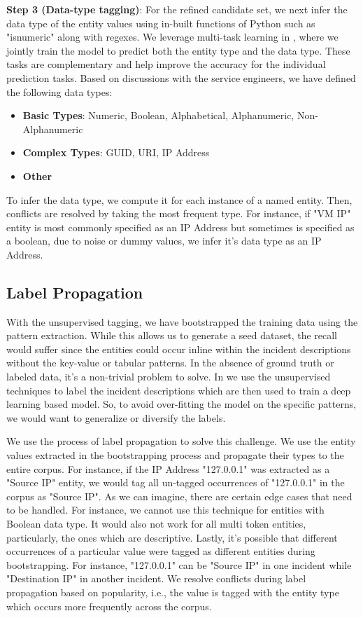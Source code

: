 \textbf{Step 3 (Data-type tagging)}: For the refined candidate set, we next infer the data type of the entity values using in-built functions of Python such as "isnumeric" along with regexes. We leverage multi-task learning in \softner{}, where we jointly train the model to predict both the entity type and the data type. These tasks are complementary and help improve the accuracy for the individual prediction tasks. Based on discussions with the service engineers, we have defined the following data types:
\begin{itemize}
    \item \textbf{Basic Types}: Numeric, Boolean, Alphabetical, Alphanumeric, Non-Alphanumeric
    \item \textbf{Complex Types}: GUID, URI, IP Address
    \item \textbf{Other}
\end{itemize}
To infer the data type, we compute it for each instance of a named entity. Then, conflicts are resolved by taking the most frequent type. For instance, if "VM IP" entity is most commonly specified as an IP Address but sometimes is specified as a boolean, due to noise or dummy values, we infer it's data type as an IP Address.

\subsection{Label Propagation}
With the unsupervised tagging, we have bootstrapped the training data using the pattern extraction. While this allows us to generate a seed dataset, the recall would suffer since the entities could occur inline within the incident descriptions without the key-value or tabular patterns. In the absence of ground truth or labeled data, it's a non-trivial problem to solve. In \softner{} we use the unsupervised techniques to label the incident descriptions which are then used to train a deep learning based model. So, to avoid over-fitting the model on the specific patterns, we would want to generalize or diversify the labels.

We use the process of label propagation to solve this challenge. We use the entity values extracted in the bootstrapping process and propagate their types to the entire corpus. For instance, if the IP Address "127.0.0.1" was extracted as a "Source IP" entity, we would tag all un-tagged occurrences of "127.0.0.1" in the corpus as "Source IP". As we can imagine, there are certain edge cases that need to be handled. For instance, we cannot use this technique for entities with Boolean data type. It would also not work for all multi token entities, particularly, the ones which are descriptive. Lastly, it's possible that different occurrences of a particular value were tagged as different entities during bootstrapping. For instance, "127.0.0.1" can be "Source IP" in one incident while "Destination IP" in another incident. We resolve conflicts during label propagation based on popularity, i.e., the value is tagged with the entity type which occurs more frequently across the corpus.

